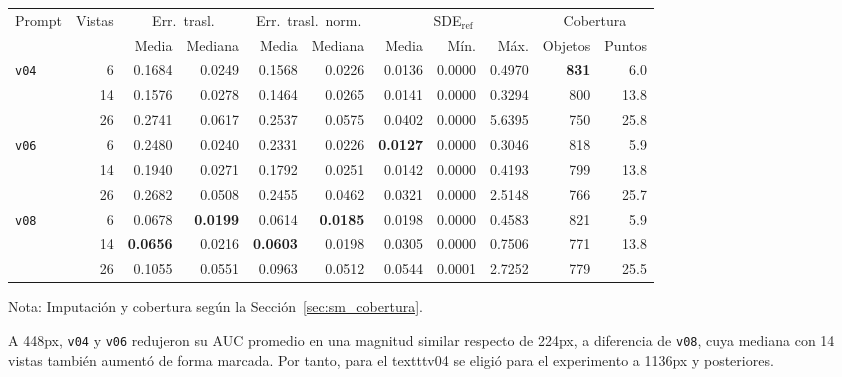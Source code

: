 \begin{table}[H]
\vspace{2ex}

\begin{tabular*}{\textwidth}{@{\extracolsep{\fill}}lrrrrrrrrrr@{}}
\toprule
\multirow{2}{*}{Prompt} & \multirow{2}{*}{Vistas} & \multicolumn{2}{c}{Err.\ trasl.} & \multicolumn{2}{c}{Err.\ trasl.\ norm.} & \multicolumn{3}{c}{SDE$_{\mathrm{ref}}$} & \multicolumn{2}{c}{Cobertura} \\
\cmidrule(lr){3-4} \cmidrule(lr){5-6} \cmidrule(lr){7-9} \cmidrule(lr){10-11}
 &  & Media & Mediana & Media & Mediana & Media & Mín. & Máx. & Objetos & Puntos \\
\midrule
\multirow{3}{*}{\texttt{v04}} & 6 & 0.1684 & 0.0249 & 0.1568 & 0.0226 & 0.0136 & 0.0000 & 0.4970 & \textbf{831} & 6.0 \\
 & 14 & 0.1576 & 0.0278 & 0.1464 & 0.0265 & 0.0141 & 0.0000 & 0.3294 & 800 & 13.8 \\
 & 26 & 0.2741 & 0.0617 & 0.2537 & 0.0575 & 0.0402 & 0.0000 & 5.6395 & 750 & 25.8 \\
\midrule
\multirow{3}{*}{\texttt{v06}} & 6 & 0.2480 & 0.0240 & 0.2331 & 0.0226 & \textbf{0.0127} & 0.0000 & 0.3046 & 818 & 5.9 \\
 & 14 & 0.1940 & 0.0271 & 0.1792 & 0.0251 & 0.0142 & 0.0000 & 0.4193 & 799 & 13.8 \\
 & 26 & 0.2682 & 0.0508 & 0.2455 & 0.0462 & 0.0321 & 0.0000 & 2.5148 & 766 & 25.7 \\
\midrule
\multirow{3}{*}{\texttt{v08}} & 6 & 0.0678 & \textbf{0.0199} & 0.0614 & \textbf{0.0185} & 0.0198 & 0.0000 & 0.4583 & 821 & 5.9 \\
 & 14 & \textbf{0.0656} & 0.0216 & \textbf{0.0603} & 0.0198 & 0.0305 & 0.0000 & 0.7506 & 771 & 13.8 \\
 & 26 & 0.1055 & 0.0551 & 0.0963 & 0.0512 & 0.0544 & 0.0001 & 2.7252 & 779 & 25.5 \\
\bottomrule
\end{tabular*}

\vspace{1.5ex}
\begin{minipage}{\textwidth}
Nota: Imputación y cobertura según la Sección~\ref{sec:sm_cobertura}.
\end{minipage}
\end{table}





A 448px, \texttt{v04} y \texttt{v06} redujeron su AUC promedio en una magnitud similar respecto de 224px, 
a diferencia de
\texttt{v08}, cuya mediana con 14 vistas también aumentó de forma marcada. Por tanto, para el  
texttt{v04} se eligió para el experimento a 1136px y posteriores. 





